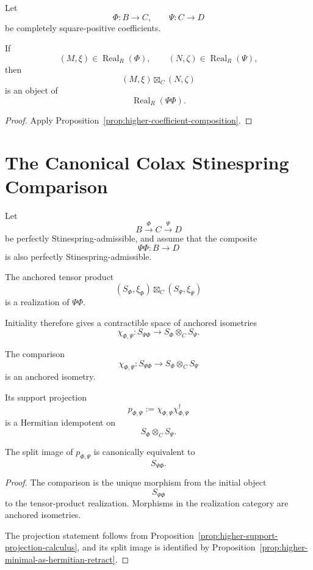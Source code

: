 \begin{corollary}
\label{cor:higher-tensoring-realizations}
Let
\[
  \Phi:B\to C,
  \qquad
  \Psi:C\to D
\]
be completely square-positive coefficients.

If
\[
  (M,\xi)\in\operatorname{Real}_R(\Phi),
  \qquad
  (N,\zeta)\in\operatorname{Real}_R(\Psi),
\]
then
\[
  (M,\xi)\boxtimes_C(N,\zeta)
\]
is an object of
\[
  \operatorname{Real}_R(\Psi\Phi).
\]
\end{corollary}

\begin{proof}
Apply Proposition~\ref{prop:higher-coefficient-composition}.
\end{proof}

\section{The Canonical Colax Stinespring Comparison}
\label{sec:higher-stinespring-colax-comparison}

Let
\[
  B\xrightarrow{\Phi}C\xrightarrow{\Psi}D
\]
be perfectly Stinespring-admissible, and assume that the composite
\[
  \Psi\Phi:B\to D
\]
is also perfectly Stinespring-admissible.

The anchored tensor product
\[
  (S_\Phi,\xi_\Phi)
  \boxtimes_C
  (S_\Psi,\xi_\Psi)
\]
is a realization of \(\Psi\Phi\).

Initiality therefore gives a contractible space of anchored isometries
\[
  \chi_{\Phi,\Psi}:
  S_{\Psi\Phi}
  \longrightarrow
  S_\Phi\otimes_CS_\Psi.
\]

\begin{theorem}
\label{thm:higher-stinespring-colax-comparison}
The comparison
\[
  \chi_{\Phi,\Psi}:
  S_{\Psi\Phi}
  \longrightarrow
  S_\Phi\otimes_CS_\Psi
\]
is an anchored isometry.

Its support projection
\[
  p_{\Phi,\Psi}
  :=
  \chi_{\Phi,\Psi}
  \chi_{\Phi,\Psi}^\dagger
\]
is a Hermitian idempotent on
\[
  S_\Phi\otimes_CS_\Psi.
\]

The split image of \(p_{\Phi,\Psi}\) is canonically equivalent to
\[
  S_{\Psi\Phi}.
\]
\end{theorem}

\begin{proof}
The comparison is the unique morphism from the initial object
\[
  S_{\Psi\Phi}
\]
to the tensor-product realization. Morphisms in the realization category are
anchored isometries.

The projection statement follows from
Proposition~\ref{prop:higher-support-projection-calculus}, and its split image
is identified by
Proposition~\ref{prop:higher-minimal-as-hermitian-retract}.
\end{proof}

